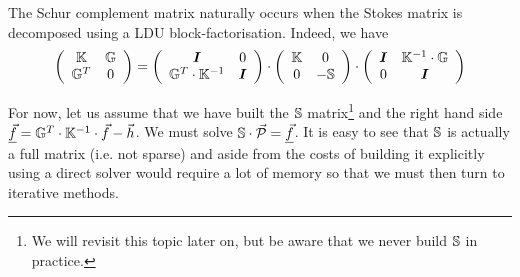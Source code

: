 \begin{remark}
The Schur complement matrix naturally occurs when the Stokes matrix is decomposed using 
a LDU block-factorisation. Indeed, we have 
\[
\left(
\begin{array}{cc}
{\mathbb{K}} & {\mathbb{G}} \\ 
{\mathbb{G}}^T & 0
\end{array}
\right)
=
\left(
\begin{array}{cc}
{\bm I} & 0 \\ 
{\mathbb{G}}^T \cdot {\mathbb{K}}^{-1} & {\bm I}
\end{array}
\right)
\cdot
\left(
\begin{array}{cc}
{\mathbb{K}} & 0 \\ 
0 & -{\mathbb{S}}
\end{array}
\right)
\cdot
\left(
\begin{array}{cc}
{\bm I} & {\mathbb{K}}^{-1} \cdot {\mathbb{G}} \\ 
0 & {\bm I}
\end{array}
\right)
\]
\end{remark}

For now, let us assume that we have built the ${\mathbb{S}}$ matrix\footnote{We will 
revisit this topic later on, but be aware that we never build ${\mathbb{S}}$ in practice.} 
and the right hand 
side $\underline{\vec{f}}={\mathbb{G}}^T \cdot {\mathbb{K}}^{-1} \cdot \vec{f} - \vec{h}$.
We must solve ${\mathbb{S}}\cdot \vec{\cal P} = \underline{\vec{f}}$.
It is easy to see that ${\mathbb{S}}$ is actually a full matrix (i.e. not sparse) and 
aside from the costs of building it explicitly using a direct solver would require 
a lot of memory so that we must then turn to iterative methods. 

